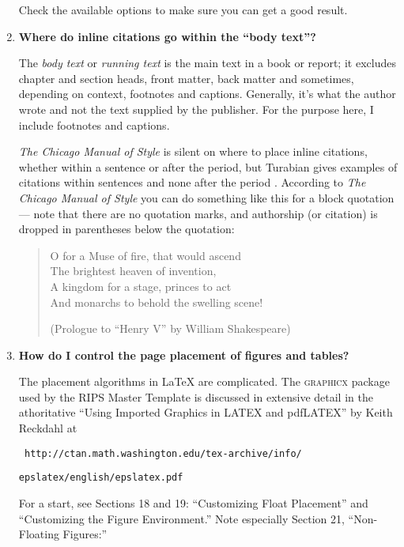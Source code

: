 \begin{enumerate}
\hspace{15pt}Check the available options to make sure you can get a good result.

\item {\bf Where do inline citations go within the ``body text''?}

The \emph{body text} or \emph{running text} is the main text in a book or report; it excludes chapter and section heads, front matter, back matter and sometimes, depending on context, footnotes and captions.  
Generally, it's what the author wrote and not the text supplied by the publisher.
For the purpose here, I include footnotes and captions.

\hspace{15pt}\emph{The Chicago Manual of Style} \cite{Chicago-Manual} is silent on where to place inline citations, whether within a sentence or after the period, 
but Turabian gives examples of citations within sentences and none after the period \cite{Turabian}.
According to  \emph{The Chicago Manual of Style} you can do something like this for a block quotation --- note that there are no quotation marks, and authorship (or citation) is dropped in parentheses below the quotation:

\begin{quote}
O for a Muse of fire, that would ascend\\
The brightest heaven of invention,\\
A kingdom for a stage, princes to act\\
And monarchs to behold the swelling scene!

\hspace{15pt}(Prologue to ``Henry V''  by William Shakespeare)
\end{quote}

\item {\bf How do I control the page placement of figures and tables?}

The placement algorithms in {\LaTeX} are complicated.
The \textsc{graphicx} package used by the RIPS Master Template is discussed in extensive detail in the  athoritative ``Using Imported Graphics in LATEX and pdfLATEX'' by Keith Reckdahl
at
\vspace{5pt}

\centerline{ \texttt{ http://ctan.math.washington.edu/tex-archive/info/}}
\centerline{ \texttt{epslatex/english/epslatex.pdf}}

\hspace{15pt}For a start, see Sections 18 and 19: ``Customizing Float Placement'' and ``Customizing the Figure Environment.''
Note especially Section 21, ``Non-Floating Figures:''  


\end{enumerate}
